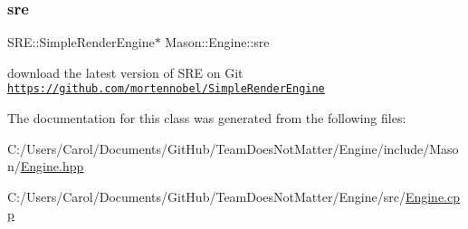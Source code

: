 \hypertarget{class_mason_1_1_engine_a8b5ac2d43f0b366ff51c0908fe581f17}{}\label{class_mason_1_1_engine_a8b5ac2d43f0b366ff51c0908fe581f17} 
\subsubsection{\texorpdfstring{sre}{sre}}
{\footnotesize\ttfamily S\+R\+E\+::\+Simple\+Render\+Engine$\ast$ Mason\+::\+Engine\+::sre}

download the latest version of S\+RE on Git \href{https://github.com/mortennobel/SimpleRenderEngine}{\tt https\+://github.\+com/mortennobel/\+Simple\+Render\+Engine} 

The documentation for this class was generated from the following files\+:\begin{DoxyCompactItemize}
\item 
C\+:/\+Users/\+Carol/\+Documents/\+Git\+Hub/\+Team\+Does\+Not\+Matter/\+Engine/include/\+Mason/\hyperlink{_engine_8hpp}{Engine.\+hpp}\item 
C\+:/\+Users/\+Carol/\+Documents/\+Git\+Hub/\+Team\+Does\+Not\+Matter/\+Engine/src/\hyperlink{_engine_8cpp}{Engine.\+cpp}\end{DoxyCompactItemize}
